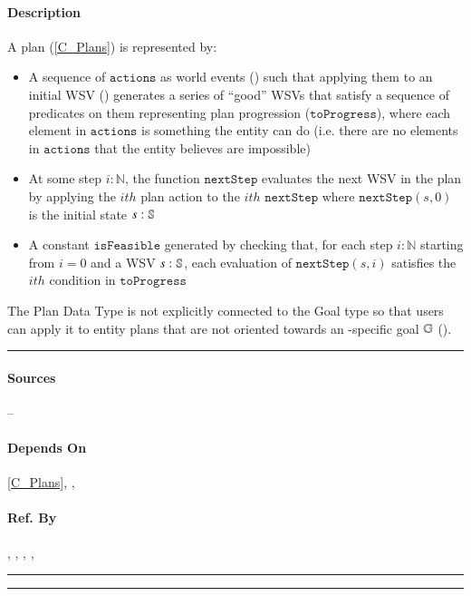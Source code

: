 \paragraph{Description} A plan (\cref{C_Plans}) is represented by:
\begin{itemize}

    \item A sequence of $\mathtt{actions}$ as world events
    () such that applying them to an initial WSV
    () generates a series of ``good'' WSVs that satisfy a
    sequence of predicates on them representing plan progression
    ($\mathtt{toProgress}$), where each element in $\mathtt{actions}$ is
    something the entity can do (i.e. there are no elements in
    $\mathtt{actions}$ that the entity believes are impossible)

    \item At some step $i : \mathbb{N}$, the function $\mathtt{nextStep}$
    evaluates the next WSV in the plan by applying the $ith$ plan action to the
    $ith$ $\mathtt{nextStep}$ where $\mathtt{nextStep}(s, 0)$ is the initial
    state $s : \mathbb{S}$

    \item A constant $\mathtt{isFeasible}$ generated by checking that, for each
    step $i : \mathbb{N}$ starting from $i = 0$ and a WSV $s :
    \mathbb{S}$, each evaluation of $\mathtt{nextStep}(s, i)$ satisfies
    the $ith$ condition in $\mathtt{toProgress}$

\end{itemize}

The Plan Data Type is not explicitly connected to the Goal type so that users
can apply it to entity plans that are not oriented towards an
\progname{}-specific goal $\mathbb{G}$ (). \\\hrule

\paragraph{Sources} --

\paragraph{Depends On} \cref{C_Plans}, ,

\paragraph{Ref. By} , ,
, , 
\\\hrule\vspace{0.5mm}\hrule

